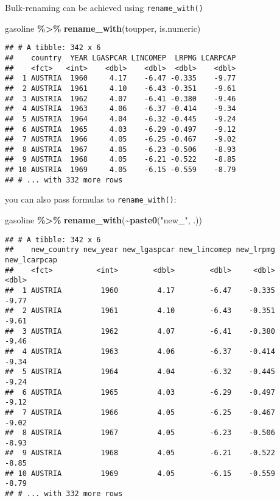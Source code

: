 \documentclass[
]{article}
\newenvironment{Shaded}{\begin{snugshade}}{\end{snugshade}}
\newcommand{\KeywordTok}[1]{\textcolor[rgb]{0.13,0.29,0.53}{\textbf{#1}}}
\newcommand{\NormalTok}[1]{#1}
\newcommand{\OperatorTok}[1]{\textcolor[rgb]{0.81,0.36,0.00}{\textbf{#1}}}
\newcommand{\StringTok}[1]{\textcolor[rgb]{0.31,0.60,0.02}{#1}}
\begin{document}
Bulk-renaming can be achieved using \texttt{rename\_with()}

\begin{Shaded}
\begin{Highlighting}[]
\NormalTok{gasoline }\OperatorTok{\%\textgreater{}\%}
\StringTok{  }\KeywordTok{rename\_with}\NormalTok{(toupper, is.numeric)}
\end{Highlighting}
\end{Shaded}

\begin{verbatim}
## # A tibble: 342 x 6
##    country  YEAR LGASPCAR LINCOMEP  LRPMG LCARPCAP
##    <fct>   <int>    <dbl>    <dbl>  <dbl>    <dbl>
##  1 AUSTRIA  1960     4.17    -6.47 -0.335    -9.77
##  2 AUSTRIA  1961     4.10    -6.43 -0.351    -9.61
##  3 AUSTRIA  1962     4.07    -6.41 -0.380    -9.46
##  4 AUSTRIA  1963     4.06    -6.37 -0.414    -9.34
##  5 AUSTRIA  1964     4.04    -6.32 -0.445    -9.24
##  6 AUSTRIA  1965     4.03    -6.29 -0.497    -9.12
##  7 AUSTRIA  1966     4.05    -6.25 -0.467    -9.02
##  8 AUSTRIA  1967     4.05    -6.23 -0.506    -8.93
##  9 AUSTRIA  1968     4.05    -6.21 -0.522    -8.85
## 10 AUSTRIA  1969     4.05    -6.15 -0.559    -8.79
## # ... with 332 more rows
\end{verbatim}

you can also pass formulas to \texttt{rename\_with()}:

\begin{Shaded}
\begin{Highlighting}[]
\NormalTok{gasoline }\OperatorTok{\%\textgreater{}\%}\StringTok{  }
\StringTok{  }\KeywordTok{rename\_with}\NormalTok{(}\OperatorTok{\textasciitilde{}}\KeywordTok{paste0}\NormalTok{(}\StringTok{"new\_"}\NormalTok{, .))}
\end{Highlighting}
\end{Shaded}

\begin{verbatim}
## # A tibble: 342 x 6
##    new_country new_year new_lgaspcar new_lincomep new_lrpmg new_lcarpcap
##    <fct>          <int>        <dbl>        <dbl>     <dbl>        <dbl>
##  1 AUSTRIA         1960         4.17        -6.47    -0.335        -9.77
##  2 AUSTRIA         1961         4.10        -6.43    -0.351        -9.61
##  3 AUSTRIA         1962         4.07        -6.41    -0.380        -9.46
##  4 AUSTRIA         1963         4.06        -6.37    -0.414        -9.34
##  5 AUSTRIA         1964         4.04        -6.32    -0.445        -9.24
##  6 AUSTRIA         1965         4.03        -6.29    -0.497        -9.12
##  7 AUSTRIA         1966         4.05        -6.25    -0.467        -9.02
##  8 AUSTRIA         1967         4.05        -6.23    -0.506        -8.93
##  9 AUSTRIA         1968         4.05        -6.21    -0.522        -8.85
## 10 AUSTRIA         1969         4.05        -6.15    -0.559        -8.79
## # ... with 332 more rows
\end{verbatim}
\end{document}
